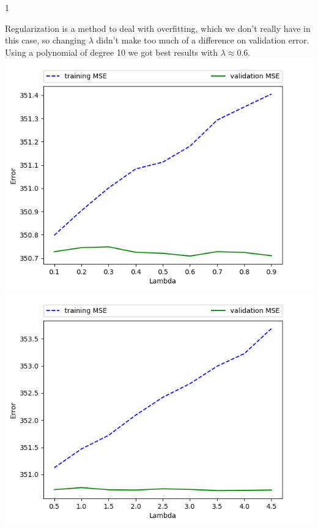 \documentclass{article}
\begin{document}
\begin{ukon-infie}[12.11.17]{1}
		\begin{exercise}[p=10]{}
        	Regularization is a method to deal with overfitting, which we don't really have in this case, so changing $\lambda$ didn't make too much of a difference on validation error. Using a polynomial of degree 10 we got best results with $\lambda \approx 0.6.$\\
        	\includegraphics[scale=0.4]{Lambda_Grad10_0_1.png}
        	\includegraphics[scale=0.4]{Lambda_grad10.png} 
		\end{exercise}
		
		\begin{exercise}[p=10]{}
        	
		\end{exercise}
		

\end{ukon-infie}
\end{document}
